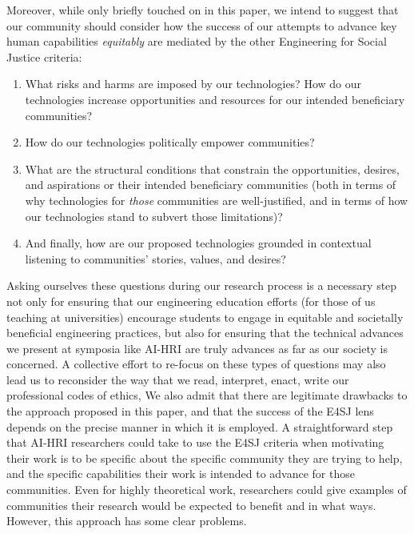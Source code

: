 \documentclass[letterpaper]{article} %
\begin{document}
Moreover, while only briefly touched on in this paper, we intend to suggest that our community should consider how the success of our attempts to advance key human capabilities \textit{equitably} are mediated by the other Engineering for Social Justice criteria:
\begin{enumerate}
    \item What risks and harms are imposed by our technologies? How do our technologies increase opportunities and resources for our intended beneficiary communities?
    \item How do our technologies politically empower communities?
    \item What are the structural conditions that constrain the opportunities, desires, and aspirations or their intended beneficiary communities (both in terms of why technologies for \textit{those} communities are well-justified, and in terms of how our technologies stand to subvert those limitations)?
    \item And finally, how are our proposed technologies grounded in contextual listening to communities' stories, values, and desires?
\end{enumerate}
Asking ourselves these questions during our research process is a necessary step not only for ensuring that our engineering education efforts (for those of us teaching at universities) encourage students to engage in equitable and societally beneficial engineering practices, but also for ensuring that the technical advances we present at symposia like AI-HRI are truly advances as far as our society is concerned. A collective effort to re-focus on these types of questions may also lead us to reconsider the way that we read, interpret, enact, write our professional codes of ethics,
We also admit that there are legitimate drawbacks to the approach proposed in this paper, and that the success of the E4SJ lens depends on the precise manner in which it is employed. A straightforward step that AI-HRI researchers could take to use the E4SJ criteria when motivating their work is to be specific about the specific community they are trying to help, and the specific capabilities their work is intended to advance for those communities. Even for highly theoretical work, researchers could give examples of communities their research would be expected to benefit and in what ways. However, this approach has some clear problems.
\end{document}
